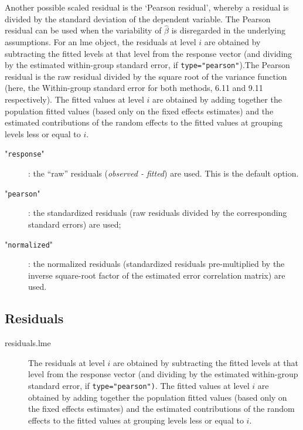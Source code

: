 \documentclass[12pt, a4paper]{report}
\theoremstyle{plain}
\theoremstyle{definition}
\theoremstyle{remark}
\begin{document}
		Another possible scaled residual is the  `Pearson residual', whereby a residual is divided by the standard deviation of the dependent variable. The Pearson residual can be used when the variability of $\hat{\beta}$ is disregarded in the underlying assumptions.
	\newpage
	For an lme object, the residuals at level $i$ are obtained by subtracting the fitted levels at that level from the response vector (and dividing by the estimated within-group standard error, if \texttt{type="pearson"}).The Pearson residual is the raw residual divided by the square root of the variance function (here, the Within-group standard error for both methods, 6.11 and 9.11 respectively). The fitted values at level $i$ are obtained by adding together the population fitted values (based only on the fixed effects estimates) and the estimated contributions of the random effects to the fitted values at grouping levels less or equal to $i$.
		
		\begin{description}
			\item["\texttt{response}"]: the “raw” residuals (\textit{observed - fitted}) are used. This is the default option.
			\item["\texttt{pearson}"]: the standardized residuals (raw residuals divided by the corresponding standard errors) are used; 
			\item["\texttt{normalized}"]: the normalized residuals (standardized residuals pre-multiplied by the inverse square-root factor of the estimated error correlation matrix) are used.
		\end{description}
	\subsection*{Residuals}
	
	\begin{description}
		\item[residuals.lme] 
		The residuals at level $i$ are obtained by subtracting the fitted levels at that level from the response
		vector (and dividing by the estimated within-group standard error, if \texttt{type="pearson")}. The fitted
		values at level $i$ are obtained by adding together the population fitted values (based only on the
		fixed effects estimates) and the estimated contributions of the random effects to the fitted values at
		grouping levels less or equal to $i$.
	\end{description}
	
\end{document}
